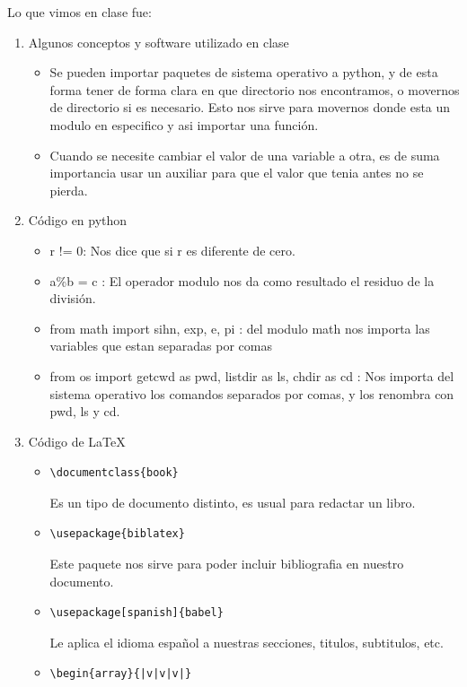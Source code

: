 \documentclass[letterpaper, 12pt, oneside]{article}%
\begin{document}
	Lo que vimos en clase fue:%
	\begin{enumerate}%
		\item Algunos conceptos y software utilizado en clase%
		\begin{itemize}
			\item Se pueden importar paquetes de sistema operativo a python, y de esta forma tener de forma clara en que directorio nos encontramos, o movernos de directorio si es necesario. Esto nos sirve para movernos donde esta un modulo en especifico y asi importar una función.
			\item Cuando se necesite cambiar el valor de una variable a otra, es de suma importancia usar un auxiliar para que el valor que tenia antes no se pierda.	

		\end{itemize}
		
		\item Código en python%
		\begin{itemize}%
			\item r != 0: Nos dice que si r es diferente de cero.
			\item a\%b = c : El operador modulo nos da como resultado el residuo de la división.
			\item from math import sihn, exp, e, pi : del modulo math nos importa las variables que estan separadas por comas
			\item from os import getcwd as pwd, listdir as ls, chdir as cd : Nos importa del sistema operativo los comandos separados por comas, y los renombra con pwd, ls y cd.
		
			
			
			
		\end{itemize}%
		\item Código de LaTeX
		\begin{itemize}
			\item 
			\begin{lstlisting}
\documentclass{book}
			\end{lstlisting} Es un tipo de documento distinto, es usual para redactar un libro.
			\item  
			\begin{lstlisting}  
\usepackage{biblatex}
			\end{lstlisting} Este paquete nos sirve para poder incluir bibliografia en nuestro documento. 
			\item 
			\begin{lstlisting}  
\usepackage[spanish]{babel}
			\end{lstlisting} Le aplica el idioma español a nuestras secciones, titulos, subtitulos, etc. 
			\item 
			\begin{lstlisting}  
\begin{array}{|v|v|v|}


\end{lstlisting}
\end{itemize}
\end{enumerate}
\end{document}
